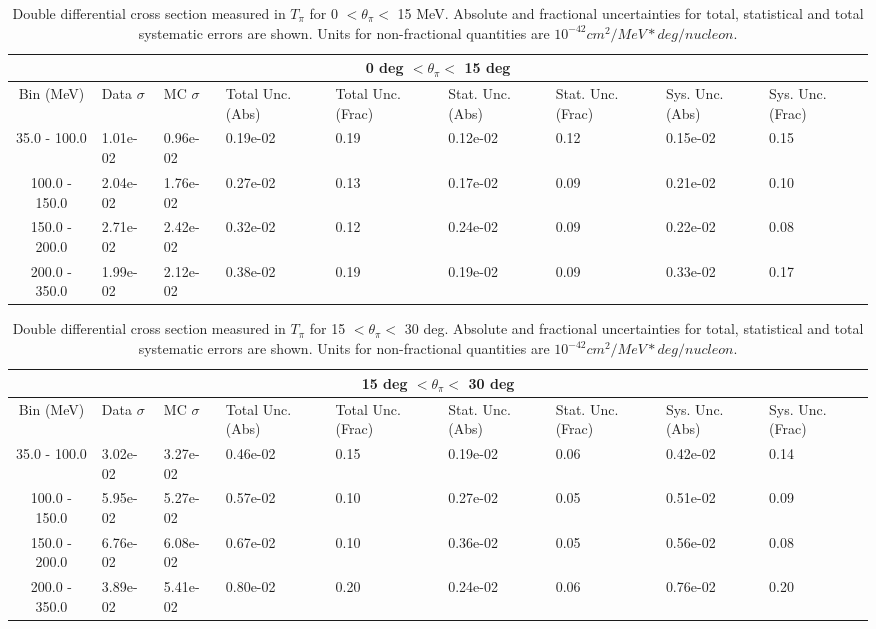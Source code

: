 \begin{table}[!htb]
    \centering
    \tiny
    \begin{tabular}{|c|p{0.5in}|p{0.5in}|p{0.5in}|p{0.5in}|p{0.5in}|p{0.5in}|p{0.5in}|p{0.5in}|}

        \hline
        \multicolumn{9}{c}{0 deg $ < \theta_\pi < $ 15 deg}\\
        \hline
        Bin (MeV)& Data $\sigma$ & MC $\sigma$ & Total Unc. (Abs) & Total Unc. (Frac)  & Stat. Unc. (Abs) & Stat. Unc. (Frac) & Sys. Unc. (Abs) & Sys. Unc. (Frac)\\ \hline
35.0 - 100.0 & 1.01e-02 & 0.96e-02 & 0.19e-02 & 0.19 & 0.12e-02 & 0.12 & 0.15e-02 & 0.15\\ \hline
100.0 - 150.0 & 2.04e-02 & 1.76e-02 & 0.27e-02 & 0.13 & 0.17e-02 & 0.09 & 0.21e-02 & 0.10\\ \hline
150.0 - 200.0 & 2.71e-02 & 2.42e-02 & 0.32e-02 & 0.12 & 0.24e-02 & 0.09 & 0.22e-02 & 0.08\\ \hline
200.0 - 350.0 & 1.99e-02 & 2.12e-02 & 0.38e-02 & 0.19 & 0.19e-02 & 0.09 & 0.33e-02 & 0.17\\ \hline

    \end{tabular}
    \caption{Double differential cross section measured in $T_\pi$ for 0 $ <\theta_\pi < $ 15 MeV. Absolute and fractional uncertainties for total, statistical and total systematic errors are shown. Units for non-fractional quantities are $10^{-42}cm^2/MeV*deg/nucleon$.}
    \label{tab:ApdxA:XSecTable2Dtpithetapi1}
\end{table}

\begin{table}[!htb]
    \centering
    \tiny
    \begin{tabular}{|c|p{0.5in}|p{0.5in}|p{0.5in}|p{0.5in}|p{0.5in}|p{0.5in}|p{0.5in}|p{0.5in}|}

        \hline
        \multicolumn{9}{c}{15 deg $ < \theta_\pi < $ 30 deg}\\
        \hline
        Bin (MeV)& Data $\sigma$ & MC $\sigma$ & Total Unc. (Abs) & Total Unc. (Frac)  & Stat. Unc. (Abs) & Stat. Unc. (Frac) & Sys. Unc. (Abs) & Sys. Unc. (Frac)\\ \hline
35.0 - 100.0 & 3.02e-02 & 3.27e-02 & 0.46e-02 & 0.15 & 0.19e-02 & 0.06 & 0.42e-02 & 0.14\\ \hline
100.0 - 150.0 & 5.95e-02 & 5.27e-02 & 0.57e-02 & 0.10 & 0.27e-02 & 0.05 & 0.51e-02 & 0.09\\ \hline
150.0 - 200.0 & 6.76e-02 & 6.08e-02 & 0.67e-02 & 0.10 & 0.36e-02 & 0.05 & 0.56e-02 & 0.08\\ \hline
200.0 - 350.0 & 3.89e-02 & 5.41e-02 & 0.80e-02 & 0.20 & 0.24e-02 & 0.06 & 0.76e-02 & 0.20\\ \hline

    \end{tabular}
    \caption{Double differential cross section measured in $T_\pi$ for 15 $ < \theta_\pi < $ 30 deg. Absolute and fractional uncertainties for total, statistical and total systematic errors are shown. Units for non-fractional quantities are $10^{-42}cm^2/MeV*deg/nucleon$.}
    \label{tab:ApdxA:XSecTable2Dtpithetapi2}
\end{table}

